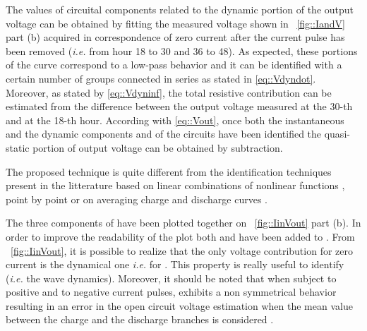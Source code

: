 \documentclass[journal]{IEEEtran}
\begin{document}
The values of circuital components related to the dynamic portion of the output voltage can be obtained by fitting the measured voltage shown in \figurename~\ref{fig::IandV} part (b) acquired in correspondence of zero current after the current pulse has been removed (\textit{i.e.} from hour 18 to 30 and 36 to 48). As expected, these portions of the  curve correspond to a low-pass behavior and it can be identified with a certain number of  groups connected in series as stated in \eqref{eq::Vdyndot}. Moreover, as stated by \eqref{eq::Vdyninf}, the total resistive contribution can be estimated from the difference  between the output voltage measured at the 30-th and at the 18-th hour. 
According with \eqref{eq::Vout}, once both the instantaneous and the dynamic components  and  of the circuits have been identified the quasi-static portion  of output voltage  can be obtained by subtraction. 

The proposed technique is quite different from the identification techniques present in the litterature based on linear combinations of nonlinear functions \cite{Plett_2004_b,Paschero_2010_b}, point by point \cite{Birkl_2015} or on averaging charge and discharge curves \cite{Hu_2011, Baronti_2015}.

The three components of  have been plotted together on \figurename~\ref{fig::IinVout} part (b). In order to improve the readability of the plot both  and  have been added to .
From \figurename~\ref{fig::IinVout}, it is possible to realize that the only voltage contribution for zero current is the dynamical one \textit{i.e.}   for . This property is really useful to identify  (\textit{i.e.} the wave dynamics). Moreover, it should be noted that when subject to positive and to negative current pulses,  exhibits a non symmetrical behavior resulting in an error in the open circuit voltage estimation when the mean value between the charge and the discharge branches is considered \cite{Hu_2011, Baronti_2015}.
\end{document}
